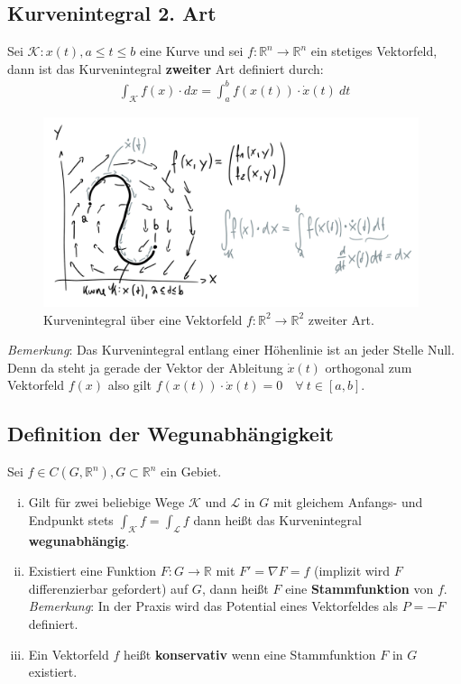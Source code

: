 \documentclass[11pt,a4paper]{book}
\newcommand {\R}	{\mathbb{R}}
\newcommand {\Rn}	{\mathbb{R}^n}
\newcommand {\Rzwei}	{\mathbb{R}^2}
\newcommand{\1}    	{\mathbbm{1}}
\newcommand{\Kurve}	{{\mathcal{K}}}
\newcommand{\Bemerkung}	{\noindent\textit{Bemerkung}: }
\begin{document}
\subsection*{Kurvenintegral 2. Art}
Sei \(\Kurve : x(t), a \leqslant t \leqslant b\) eine Kurve und sei \(f : \Rn \rightarrow \Rn\) ein stetiges Vektorfeld, dann ist das Kurvenintegral \textbf{zweiter} Art definiert durch:
\begin{align*}
	\int_\Kurve f(x) \cdot dx = \int_a^b f(x(t)) \cdot \dot{x}(t) ~dt
\end{align*}
\begin{figure}[H]
  	\centering
 	\includegraphics[width=11cm]{grafiken/Kurvenint_zweiter_Art.png}
  	\caption{Kurvenintegral über eine Vektorfeld \(f:\Rzwei \rightarrow \Rzwei\) zweiter Art.}
\end{figure}
\Bemerkung Das Kurvenintegral entlang einer Höhenlinie ist an jeder Stelle Null. Denn da steht ja gerade der Vektor der Ableitung \(\dot{x}(t)\) orthogonal zum Vektorfeld \(f(x)\) also gilt \(f(x(t)) \cdot \dot{x}(t) = 0 \quad \forall~ t \in [a,b]\).

\subsection{Definition der Wegunabhängigkeit}
Sei \(f \in C(G,\Rn), G \subset \Rn\) ein Gebiet.
\begin{enumerate}[(i)]
	\item Gilt für zwei beliebige Wege \(\Kurve\) und \(\mathcal{L}\) in \(G\) mit gleichem Anfangs- und Endpunkt stets \(\int_\Kurve f = \int_\mathcal{L} f\) dann heißt das Kurvenintegral \textbf{wegunabhängig}.
	\item Existiert eine Funktion \(F:G \rightarrow \R\) mit \(F' = \nabla F = f\) (implizit wird \(F\) differenzierbar gefordert) auf \(G\), dann heißt \(F\) eine \textbf{Stammfunktion} von \(f\).\\
	\Bemerkung In der Praxis wird das Potential eines Vektorfeldes als \(P = -F\) definiert.
	\item Ein Vektorfeld \(f\) heißt \textbf{konservativ} wenn eine Stammfunktion \(F\) in \(G\) existiert.
\end{enumerate}
\end{document}
